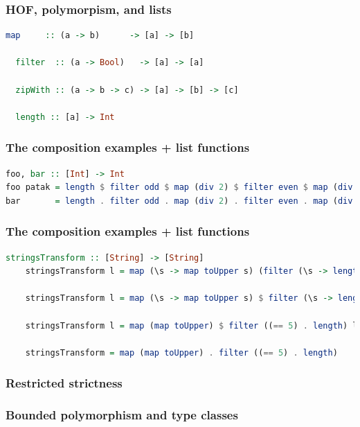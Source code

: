 \documentclass[10pt,pdf,utf8,russian,aspectratio=169]{beamer}
\begin{document}
\begin{frame}[fragile]
  \frametitle{HOF, polymorpism, and lists}

  \begin{lstlisting}[language=Haskell]
  map     :: (a -> b)      -> [a] -> [b]

  filter  :: (a -> Bool)   -> [a] -> [a]

  zipWith :: (a -> b -> c) -> [a] -> [b] -> [c]

  length :: [a] -> Int

  \end{lstlisting}

\vspace{\baselineskip}

\end{frame}

\begin{frame}[fragile]
    \frametitle{The composition examples + list functions}
\begin{lstlisting}[language=Haskell]
foo, bar :: [Int] -> Int
foo patak = length $ filter odd $ map (div 2) $ filter even $ map (div 7) patak
bar       = length . filter odd . map (div 2) . filter even . map (div 7)
\end{lstlisting}
\end{frame}

\begin{frame}[fragile]
    \frametitle{The composition examples + list functions}
    \begin{lstlisting}[language=Haskell]
    stringsTransform :: [String] -> [String]
    stringsTransform l = map (\s -> map toUpper s) (filter (\s -> length s == 5) l)

    stringsTransform l = map (\s -> map toUpper s) $ filter (\s -> length s == 5) l

    stringsTransform l = map (map toUpper) $ filter ((== 5) . length) l

    stringsTransform = map (map toUpper) . filter ((== 5) . length)
    \end{lstlisting}
\end{frame}

\begin{frame}
  \frametitle{Restricted strictness}
\end{frame}

\begin{frame}
  \frametitle{Bounded polymorphism and type classes}


\end{frame}
\end{document}
